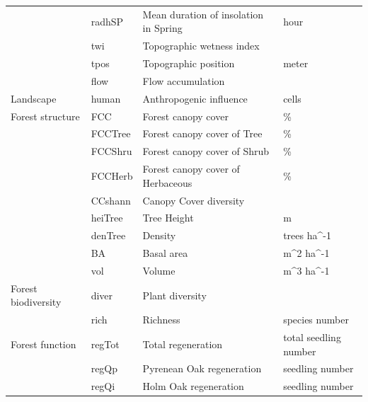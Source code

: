 \begin{table}[H]
\begin{tabular}{llll}
 & radhSP & Mean duration of insolation in Spring & hour \\
 & twi & Topographic wetness index &  \\
 & tpos & Topographic position & meter \\
 & flow & Flow accumulation &  \\ 
\hline
Landscape & human & Anthropogenic influence & cells \\ 
\hline
\multirow{}{}{Forest structure} & FCC & Forest canopy cover & \% \\
 & FCCTree & Forest canopy cover of Tree & \% \\
 & FCCShru & Forest canopy cover of Shrub & \% \\
 & FCCHerb & Forest canopy cover of Herbaceous & \% \\
 & CCshann & Canopy Cover diversity &  \\
 & heiTree & Tree Height & m \\
 & denTree & Density & trees ha^{-1} \\
 & BA & Basal area & m^2 ha^{-1} \\
 & vol & Volume & m^{3} ha^{-1} \\ 
\hline
\multirow{}{}{Forest biodiversity} & diver & Plant diversity &  \\
 & rich & Richness & species number \\ 
\hline
\multirow{}{}{Forest function} & regTot & Total regeneration & total seedling number \\
 & regQp & Pyrenean Oak regeneration & seedling number \\
 & regQi & Holm Oak regeneration & seedling number \\
\hline
\end{tabular}
\endgroup{}
\end{table}


